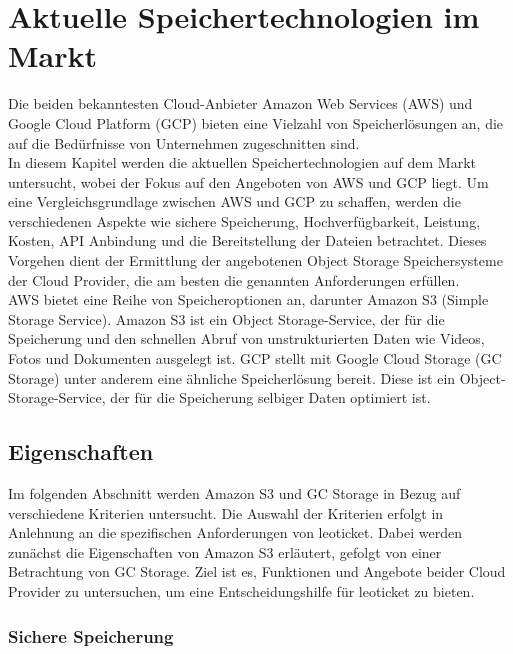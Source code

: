 \newpage

\section{Aktuelle Speichertechnologien im Markt}

Die beiden bekanntesten Cloud-Anbieter Amazon Web Services (AWS) und Google Cloud Platform (GCP) bieten eine Vielzahl von Speicherlösungen an, die auf die Bedürfnisse von Unternehmen zugeschnitten sind.\\ 

In diesem Kapitel werden die aktuellen Speichertechnologien auf dem Markt untersucht, wobei der Fokus auf den Angeboten von AWS und GCP liegt. Um eine Vergleichsgrundlage zwischen AWS und GCP zu schaffen, werden die verschiedenen Aspekte wie sichere Speicherung, Hochverfügbarkeit, Leistung, Kosten, API Anbindung und die Bereitstellung der Dateien betrachtet. Dieses Vorgehen dient der Ermittlung der angebotenen Object Storage Speichersysteme der Cloud Provider, die am besten die genannten Anforderungen erfüllen.\\

AWS bietet eine Reihe von Speicheroptionen an, darunter Amazon S3 (Simple Storage Service). Amazon S3 ist ein Object Storage-Service, der für die Speicherung und den schnellen Abruf von unstrukturierten Daten wie Videos, Fotos und Dokumenten ausgelegt ist. GCP stellt mit Google Cloud Storage (GC Storage) unter anderem eine ähnliche Speicherlösung bereit. Diese ist ein Object-Storage-Service, der für die Speicherung selbiger Daten optimiert ist.\\

\subsection{Eigenschaften}

Im folgenden Abschnitt werden Amazon S3 und GC Storage in Bezug auf verschiedene Kriterien untersucht. Die Auswahl der Kriterien erfolgt in Anlehnung an die spezifischen Anforderungen von leoticket. Dabei werden zunächst die Eigenschaften von Amazon S3 erläutert, gefolgt von einer Betrachtung von GC Storage. Ziel ist es, Funktionen und Angebote beider Cloud Provider zu untersuchen, um eine Entscheidungshilfe für leoticket zu bieten. 

\newpage

\subsubsection{Sichere Speicherung}

